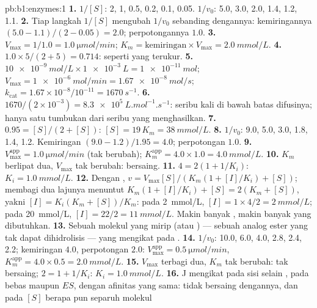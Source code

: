 \begin{solution}{pb:b1:enzymes:1}
\textbf{1.} $1/[S]$: 2, 1, 0.5, 0.2, 0.1, 0.05. $1/v_0$: 5.0, 3.0, 2.0,
1.4, 1.2, 1.1.
\textbf{2.} Tiap langkah $1/[S]$ mengubah $1/v_0$ sebanding dengannya:
kemiringannya $(5.0 - 1.1)/(2 - 0.05) = 2.0$; perpotongannya $1.0$.
\textbf{3.} $V_{\max} = 1/1.0 = \qty{1.0}{\micro mol/min}$; $K_m =
\text{kemiringan}\times V_{\max} = \qty{2.0}{mmol/L}$.
\textbf{4.} $1.0\times 5/(2 + 5) = 0.714$: seperti yang terukur.
\textbf{5.} $\qty{10e-9}{mol/L}\times\qty{1e-3}{L} = \qty{1e-11}{mol}$;
$V_{\max} = \qty{1e-6}{mol/min} = \qty{1.67e-8}{mol/s}$;
$k_{\text{cat}} = 1.67\times 10^{-8}/10^{-11} = \qty{1670}{s^{-1}}$.
\textbf{6.} $1670/(2\times 10^{-3}) = \qty{8.3e5}{L.mol^{-1}.s^{-1}}$:
seribu kali di bawah batas difusinya; hanya satu tumbukan dari seribu
yang menghasilkan.
\textbf{7.} $0.95 = [S]/(2 + [S])$: $[S] = 19\,K_m = \qty{38}{mmol/L}$.
\textbf{8.} $1/v_0$: 9.0, 5.0, 3.0, 1.8, 1.4, 1.2. Kemiringan $(9.0 -
1.2)/1.95 = 4.0$; perpotongan $1.0$.
\textbf{9.} $V_{\max}^{\text{app}} = \qty{1.0}{\micro mol/min}$ (tak
berubah); $K_m^{\text{app}} = 4.0\times 1.0 = \qty{4.0}{mmol/L}$.
\textbf{10.} $K_m$ berlipat dua, $V_{\max}$ tak berubah: bersaing.
\textbf{11.} $4 = 2(1 + 1/K_i)$: $K_i = \qty{1.0}{mmol/L}$.
\textbf{12.} Dengan , $v = V_{\max}[S]/(K_m(1 + [I]/K_i) +
[S])$; membagi dua lajunya menuntut $K_m(1 + [I]/K_i) + [S] = 2(K_m +
[S])$, yakni $[I] = K_i(K_m + [S])/K_m$: pada \qty{2}{mmol/L}, $[I] =
1\times 4/2 = \qty{2}{mmol/L}$; pada \qty{20}{mmol/L}, $[I] = 22/2 =
\qty{11}{mmol/L}$. Makin banyak , makin banyak 
yang dibutuhkan.
\textbf{13.} Sebuah molekul yang mirip  (atau ) --- sebuah analog ester yang tak dapat dihidrolisis ---
yang mengikat pada .
\textbf{14.} $1/v_0$: 10.0, 6.0, 4.0, 2.8, 2.4, 2.2; kemiringan $4.0$,
perpotongan $2.0$: $V_{\max}^{\text{app}} = \qty{0.5}{\micro mol/min}$,
$K_m^{\text{app}} = 4.0\times 0.5 = \qty{2.0}{mmol/L}$.
\textbf{15.} $V_{\max}$ terbagi dua, $K_m$ tak berubah: tak bersaing;
$2 = 1 + 1/K_i$: $K_i = \qty{1.0}{mmol/L}$.
\textbf{16.} J mengikat pada sisi selain , pada 
bebas maupun $ES$, dengan afinitas yang sama:  tidak
bersaing dengannya, dan pada $[S]$ berapa pun separuh molekul 

\end{solution}
